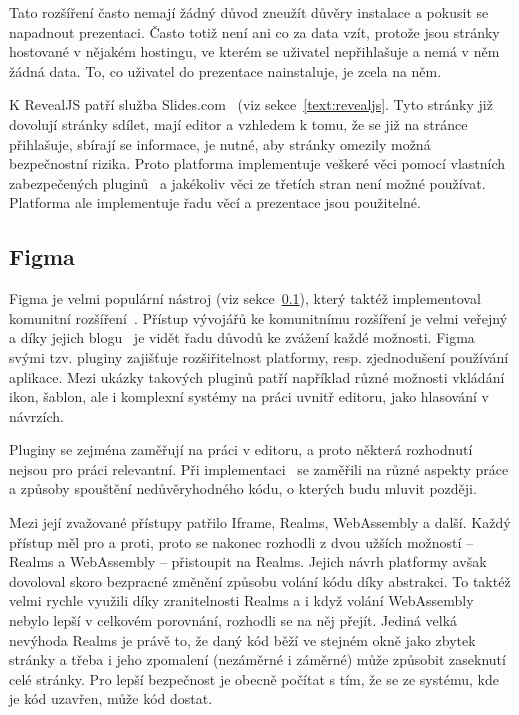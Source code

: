 Tato rozšíření často nemají žádný důvod zneužít důvěry instalace a pokusit se napadnout prezentaci.
Často totiž není ani co za data vzít, protože jsou stránky hostované v nějakém hostingu, ve kterém se uživatel nepřihlašuje a nemá v něm žádná data.
To, co uživatel do prezentace nainstaluje, je zcela na něm.

K RevealJS patří služba Slides.com~\cite{slidescom} (viz sekce~\ref{text:revealjs}.
Tyto stránky již dovolují stránky sdílet, mají editor a vzhledem k tomu, že se již na stránce přihlašuje, sbírají se informace, je nutné, aby stránky omezily možná bezpečnostní rizika.
Proto platforma implementuje veškeré věci pomocí vlastních zabezpečených pluginů~\cite{slidescom} a jakékoliv věci ze třetích stran není možné používat.
Platforma ale implementuje řadu věcí a prezentace jsou použitelné.

\subsection{Figma}\label{text:figma}

Figma je velmi populární nástroj (viz sekce~\ref{text:figma}), který taktéž implementoval komunitní rozšíření~\cite{figma_website}.
Přístup vývojářů ke komunitnímu rozšíření je velmi veřejný a díky jejich blogu~\cite{figma_plugins_blog} je vidět řadu důvodů ke zvážení každé možnosti.
Figma svými tzv. pluginy zajišťuje rozšiřitelnost platformy, resp. zjednodušení používání aplikace.
Mezi ukázky takových pluginů patří například různé možnosti vkládání ikon, šablon, ale i komplexní systémy na práci uvnitř editoru, jako hlasování v návrzích.

Pluginy se zejména zaměřují na práci v editoru, a proto některá rozhodnutí nejsou pro práci relevantní.
Při implementaci~\cite{figma_plugins_blog} se zaměřili na různé aspekty práce a způsoby spouštění nedůvěryhodného kódu, o kterých budu mluvit později.

Mezi její zvažované přístupy patřilo Iframe, Realms, WebAssembly a další.
Každý přístup měl pro a proti, proto se nakonec rozhodli z dvou užších možností -- Realms a WebAssembly -- přistoupit na Realms.
Jejich návrh platformy avšak dovoloval skoro bezpracné změnění způsobu volání kódu díky abstrakci.
To taktéž velmi rychle využili díky zranitelnosti Realms a i když volání WebAssembly nebylo lepší v celkovém porovnání, rozhodli se na něj přejít.
Jediná velká nevýhoda Realms je právě to, že daný kód běží ve stejném okně jako zbytek stránky a třeba i jeho zpomalení (nezáměrné i záměrné) může způsobit zaseknutí celé stránky.
Pro lepší bezpečnost je obecně počítat s tím, že se ze systému, kde je kód uzavřen, může kód dostat.


